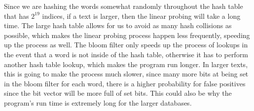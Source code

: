 \documentclass[11pt]{article}
\begin{document}
Since we are hashing the words somewhat randomly throughout the hash table that has \(2^{19}\) indices, if a text is larger, then the linear probing will take a long time. The large hash table allows for us to avoid as many hash collisions as possible, which makes the linear probing process happen less frequently, speeding up the process as well. The bloom filter only speeds up the process of lookups in the event that a word is not inside of the hash table, otherwise it has to perform another hash table lookup, which makes the program run longer. In larger texts, this is going to make the process much slower, since many more bits at being set in the bloom filter for each word, there is a higher probability for false positives since the bit vector will be more full of set bits. This could also be why the program's run time is extremely long for the larger databases.
\end{document}
